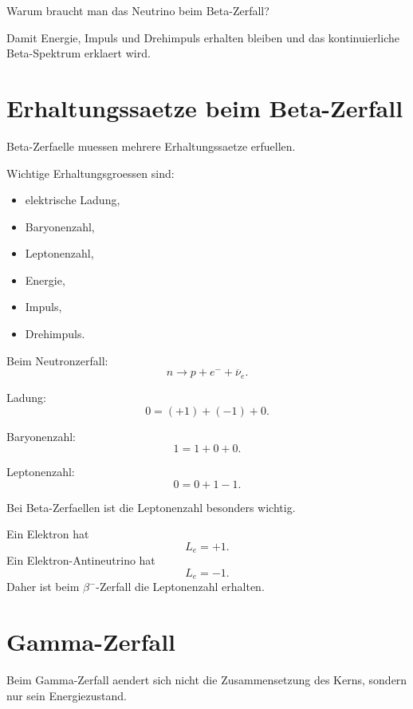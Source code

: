 \begin{examtipbox}
Warum braucht man das Neutrino beim Beta-Zerfall?

Damit Energie, Impuls und Drehimpuls erhalten bleiben und das kontinuierliche
Beta-Spektrum erklaert wird.
\end{examtipbox}

\section{Erhaltungssaetze beim Beta-Zerfall}

Beta-Zerfaelle muessen mehrere Erhaltungssaetze erfuellen.

\begin{notebox}
Wichtige Erhaltungsgroessen sind:
\begin{itemize}
    \item elektrische Ladung,
    \item Baryonenzahl,
    \item Leptonenzahl,
    \item Energie,
    \item Impuls,
    \item Drehimpuls.
\end{itemize}
\end{notebox}

\begin{examplebox}
Beim Neutronzerfall:
\[
    n \rightarrow p + e^- + \overline{\nu}_e.
\]

Ladung:
\[
    0 = (+1) + (-1) + 0.
\]

Baryonenzahl:
\[
    1 = 1 + 0 + 0.
\]

Leptonenzahl:
\[
    0 = 0 + 1 - 1.
\]
\end{examplebox}

\begin{examtipbox}
Bei Beta-Zerfaellen ist die Leptonenzahl besonders wichtig.

Ein Elektron hat
\[
    L_e=+1.
\]
Ein Elektron-Antineutrino hat
\[
    L_e=-1.
\]
Daher ist beim $\beta^-$-Zerfall die Leptonenzahl erhalten.
\end{examtipbox}

\section{Gamma-Zerfall}

Beim Gamma-Zerfall aendert sich nicht die Zusammensetzung des Kerns, sondern nur
sein Energiezustand.

